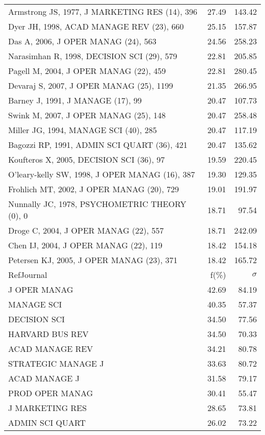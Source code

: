 \documentclass[a4paper,11pt]{report}
\begin{document}
\begin{landscape}
\begin{table}[!ht]
{\begin{tabular}{|l r r|}
Armstrong JS, 1977, J MARKETING RES (14), 396 & 27.49 & 143.42\\
Dyer JH, 1998, ACAD MANAGE REV (23), 660 & 25.15 & 157.87\\
Das A, 2006, J OPER MANAG (24), 563 & 24.56 & 258.23\\
Narasimhan R, 1998, DECISION SCI (29), 579 & 22.81 & 205.85\\
Pagell M, 2004, J OPER MANAG (22), 459 & 22.81 & 280.45\\
Devaraj S, 2007, J OPER MANAG (25), 1199 & 21.35 & 266.95\\
Barney J, 1991, J MANAGE (17), 99 & 20.47 & 107.73\\
Swink M, 2007, J OPER MANAG (25), 148 & 20.47 & 258.48\\
Miller JG, 1994, MANAGE SCI (40), 285 & 20.47 & 117.19\\
Bagozzi RP, 1991, ADMIN SCI QUART (36), 421 & 20.47 & 135.62\\
Koufteros X, 2005, DECISION SCI (36), 97 & 19.59 & 220.45\\
O'leary-kelly SW, 1998, J OPER MANAG (16), 387 & 19.30 & 129.35\\
Frohlich MT, 2002, J OPER MANAG (20), 729 & 19.01 & 191.97\\
Nunnally JC, 1978, PSYCHOMETRIC THEORY (0), 0 & 18.71 & 97.54\\
Droge C, 2004, J OPER MANAG (22), 557 & 18.71 & 242.09\\
Chen IJ, 2004, J OPER MANAG (22), 119 & 18.42 & 154.18\\
Petersen KJ, 2005, J OPER MANAG (23), 371 & 18.42 & 165.72\\
\hline
\hline
RefJournal & f(\%) & $\sigma$\\
\hline
J OPER MANAG & 42.69 & 84.19\\
MANAGE SCI & 40.35 & 57.37\\
DECISION SCI & 34.50 & 77.56\\
HARVARD BUS REV & 34.50 & 70.33\\
ACAD MANAGE REV & 34.21 & 80.78\\
STRATEGIC MANAGE J & 33.63 & 80.72\\
ACAD MANAGE J & 31.58 & 79.17\\
PROD OPER MANAG & 30.41 & 55.47\\
J MARKETING RES & 28.65 & 73.81\\
ADMIN SCI QUART & 26.02 & 73.22\\
\hline
\end{tabular}
}
\end{table}


\end{landscape}
\end{document}
